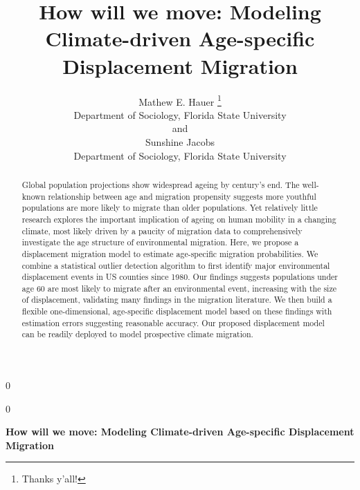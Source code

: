 \documentclass[12pt]{article}
\newcommand{\blind}{0}
\begin{document}
\def\spacingset#1{\renewcommand{\baselinestretch}%
{#1}\small\normalsize} \spacingset{1}



\blind
{
  \title{\bf How will we move: Modeling Climate-driven Age-specific
Displacement Migration}

  \author{
        Mathew E. Hauer \thanks{Thanks y'all!} \\
    Department of Sociology, Florida State University\\
     and \\     Sunshine Jacobs \\
    Department of Sociology, Florida State University\\
      }
  \maketitle
} \fi

\blind
{
  \bigskip
  \bigskip
  \bigskip
  \begin{center}
    {\LARGE\bf How will we move: Modeling Climate-driven Age-specific
Displacement Migration}
  \end{center}
  \medskip
} \fi

\bigskip
\begin{abstract}
Global population projections show widespread ageing by century's end.
The well-known relationship between age and migration propensity
suggests more youthful populations are more likely to migrate than older
populations. Yet relatively little research explores the important
implication of ageing on human mobility in a changing climate, most
likely driven by a paucity of migration data to comprehensively
investigate the age structure of environmental migration. Here, we
propose a displacement migration model to estimate age-specific
migration probabilities. We combine a statistical outlier detection
algorithm to first identify major environmental displacement events in
US counties since 1980. Our findings suggests populations under age 60
are most likely to migrate after an environmental event, increasing with
the size of displacement, validating many findings in the migration
literature. We then build a flexible one-dimensional, age-specific
displacement model based on these findings with estimation errors
suggesting reasonable accuracy. Our proposed displacement model can be
readily deployed to model prospective climate migration.
\end{abstract}
\end{document}

